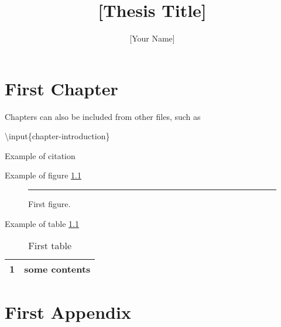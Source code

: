 \documentclass{hkustthesis}
\begin{document}
\title{
    [Thesis Title]
}
\author{[Your Name]}
\date{} %
\maketitle

\chapter{First Chapter}
Chapters can also be included from other files, such as

\textbackslash input\{chapter-introduction\}

Example of citation \cite{Chapman1970}

Example of figure \ref{figure:figure_example}
\begin{figure}[h]
    \centering
    \rule{1cm}{1cm}
    \caption{First figure.}
    \label{figure:figure_example}
\end{figure}

Example of table \ref{table:table_example}
\begin{table}[h]
    \caption{First table}
    \label{table:table_example}
    \centering
    \begin{tabular}{|l|l|}
      \hline
      1 &  some contents\\
      \hline
    \end{tabular}
\end{table}




\appendix
\chapter{First Appendix}
\end{document}

